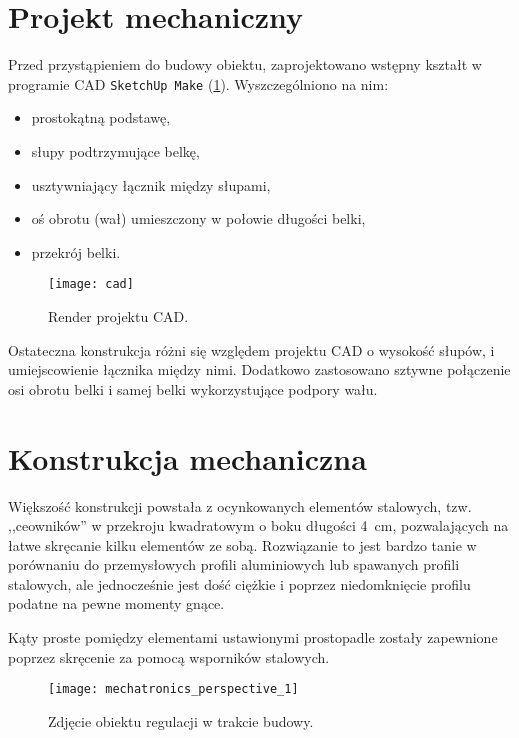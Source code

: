 \section{Projekt mechaniczny}

Przed przystąpieniem do budowy obiektu, zaprojektowano wstępny kształt w programie \textsc{CAD} \texttt{SketchUp Make} (\cref{fig:cad_render_1}). Wyszczególniono na nim:

\begin{itemize}
	\item prostokątną podstawę,
	\item słupy podtrzymujące belkę,
	\item usztywniający łącznik między słupami,
	\item oś obrotu (wał) umieszczony w połowie długości belki,
	\item przekrój belki.
\end{itemize}

\begin{figure}[H]
	\centering
	\texttt{[image: cad]}
	\caption{Render projektu CAD.}
	\label{fig:cad_render_1}
\end{figure}

Ostateczna konstrukcja różni się względem projektu \textsc{CAD} o wysokość słupów, i umiejscowienie łącznika między nimi. Dodatkowo zastosowano sztywne połączenie osi obrotu belki i samej belki wykorzystujące podpory wału.

\section{Konstrukcja mechaniczna}

Większość konstrukcji powstała z ocynkowanych elementów stalowych, tzw. ,,ceowników'' w przekroju kwadratowym o boku długości \SI[mode=text]{4}{cm}, pozwalających na łatwe skręcanie kilku elementów ze sobą. Rozwiązanie to jest bardzo tanie w porównaniu do przemysłowych profili aluminiowych lub spawanych profili stalowych, ale jednocześnie jest dość ciężkie i poprzez niedomknięcie profilu podatne na pewne momenty gnące.

Kąty proste pomiędzy elementami ustawionymi prostopadle zostały zapewnione poprzez skręcenie za pomocą wsporników stalowych.

\begin{figure}[H]
	\centering
	\texttt{[image: mechatronics\_perspective\_1]}
	\caption{Zdjęcie obiektu regulacji w trakcie budowy.}
	\label{fig:mechatronics_perspective_1}
\end{figure}

